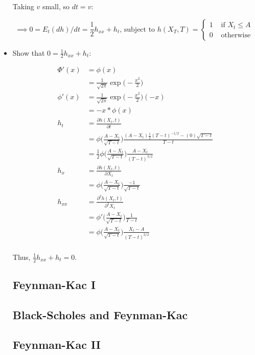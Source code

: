 \documentclass{article}
\begin{document}
\begin{itemize}
Taking $v$ small, so $dt = v$:

$$
\implies 0 = E_t(dh)/dt = \frac{1}{2} h_{xx} + h_t \text{, subject to } h(X_T, T) = \begin{cases} 1 &\text{ if } X_t \le A \\ 0 & \text{ otherwise }\end{cases}
$$

\item Show that $0 = \frac{1}{2} h_{xx} + h_t$:

\begin{align*}
\Phi'(x) &= \phi(x) \\
&= \frac{1}{\sqrt{2\pi}} \exp \Bigg(- \frac{x^2}{2}\Bigg)\\
\phi'(x) 
&= \frac{1}{\sqrt{2\pi}} \exp \Bigg(- \frac{x^2}{2}\Bigg) (-x)\\
&= -x*\phi(x)\\
h_t 
&= \frac{\partial h(X_t, t)}{\partial t} \\
&= \phi\Bigg(\frac{A - X_t}{\sqrt{T-t}}\Bigg) \frac{(A - X_t)\frac{1}{2}(T-t)^{-1/2} - (0)\sqrt{T -t}}{T - t} \\
&= \frac{1}{2}\phi\Bigg(\frac{A - X_t}{\sqrt{T-t}}\Bigg) \frac{A-X_t}{(T - t)^{3/2}} \\
h_x 
&= \frac{\partial h(X_t, t)}{\partial X_t} \\
&= \phi\Bigg(\frac{A - X_t}{\sqrt{T-t}}\Bigg) \frac{-1}{\sqrt{T - t}} \\
h_{xx} 
&= \frac{\partial^2 h(X_t, t)}{\partial^2 X_t} \\
&= \phi'\Bigg(\frac{A - X_t}{\sqrt{T-t}}\Bigg) \frac{1}{T - t} \\
&= \phi\Bigg(\frac{A - X_t}{\sqrt{T-t}}\Bigg) \frac{X_t-A}{(T-t)^{3/2}} \\
\end{align*}

Thus, $\frac{1}{2} h_{xx} + h_t = 0$.

\subsection*{Feynman-Kac I}
\subsection*{Black-Scholes and Feynman-Kac}
\subsection*{Feynman-Kac II}
















\end{itemize}
\end{document}
